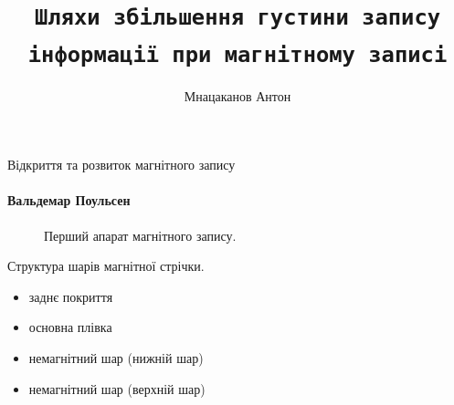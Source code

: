\documentclass{beamer}
\title{\texttt{Шляхи збiльшення густини запису iнформацiї при магнiтному записi}} %
\author{Мнацаканов Антон}
\begin{document}
  \shorthandoff{-}
  \frame[c]{\maketitle}



    \begin{frame}{Відкриття та розвиток магнітного запису}
      \framesubtitle{Вальдемар Поульсен}%
        \begin{figure}[h]
          \caption{Перший апарат магнітного запису.}
          
        \end{figure}
    \end{frame}
    \begin{frame}[label=lists]{Структура шарів магнітної стрічки.}
 \begin{figure}[h]
  \end{figure}
  \begin{itemize}
    \item заднє покриття
    \item основна плівка
    \item немагнітний шар (нижній шар)
    \item немагнітний шар (верхній шар) 
  \end{itemize}
    \end{frame}
\end{document}
